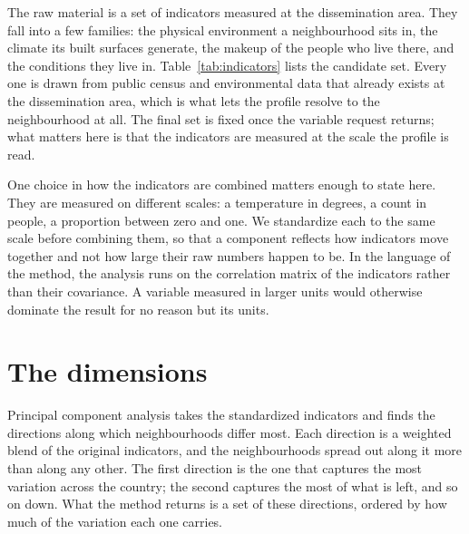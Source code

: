 The raw material is a set of indicators measured at the dissemination area. They fall into a few families: the physical environment a neighbourhood sits in, the climate its built surfaces generate, the makeup of the people who live there, and the conditions they live in. Table~\ref{tab:indicators} lists the candidate set. Every one is drawn from public census and environmental data that already exists at the dissemination area, which is what lets the profile resolve to the neighbourhood at all. The final set is fixed once the variable request returns; what matters here is that the indicators are measured at the scale the profile is read.

\begin{table}[ht]
\centering
\caption{Candidate vulnerability indicators, by domain and pathway to heat-mortality risk.}
\label{tab:indicators}
\end{table}

One choice in how the indicators are combined matters enough to state here. They are measured on different scales: a temperature in degrees, a count in people, a proportion between zero and one. We standardize each to the same scale before combining them, so that a component reflects how indicators move together and not how large their raw numbers happen to be. In the language of the method, the analysis runs on the correlation matrix of the indicators rather than their covariance. A variable measured in larger units would otherwise dominate the result for no reason but its units.

\section{The dimensions}

Principal component analysis takes the standardized indicators and finds the directions along which neighbourhoods differ most. Each direction is a weighted blend of the original indicators, and the neighbourhoods spread out along it more than along any other. The first direction is the one that captures the most variation across the country; the second captures the most of what is left, and so on down. What the method returns is a set of these directions, ordered by how much of the variation each one carries.

